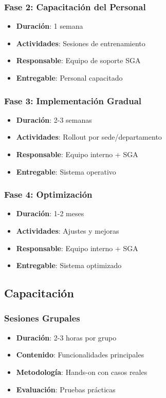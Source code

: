 \documentclass[12pt,a4paper]{article}
\begin{document}
\subsubsection{Fase 2: Capacitación del Personal}
\begin{itemize}
    \item \textbf{Duración}: 1 semana
    \item \textbf{Actividades}: Sesiones de entrenamiento
    \item \textbf{Responsable}: Equipo de soporte SGA
    \item \textbf{Entregable}: Personal capacitado
\end{itemize}

\subsubsection{Fase 3: Implementación Gradual}
\begin{itemize}
    \item \textbf{Duración}: 2-3 semanas
    \item \textbf{Actividades}: Rollout por sede/departamento
    \item \textbf{Responsable}: Equipo interno + SGA
    \item \textbf{Entregable}: Sistema operativo
\end{itemize}

\subsubsection{Fase 4: Optimización}
\begin{itemize}
    \item \textbf{Duración}: 1-2 meses
    \item \textbf{Actividades}: Ajustes y mejoras
    \item \textbf{Responsable}: Equipo interno + SGA
    \item \textbf{Entregable}: Sistema optimizado
\end{itemize}

\subsection{Capacitación}

\subsubsection{Sesiones Grupales}
\begin{itemize}
    \item \textbf{Duración}: 2-3 horas por grupo
    \item \textbf{Contenido}: Funcionalidades principales
    \item \textbf{Metodología}: Hands-on con casos reales
    \item \textbf{Evaluación}: Pruebas prácticas
\end{itemize}
\end{document}
